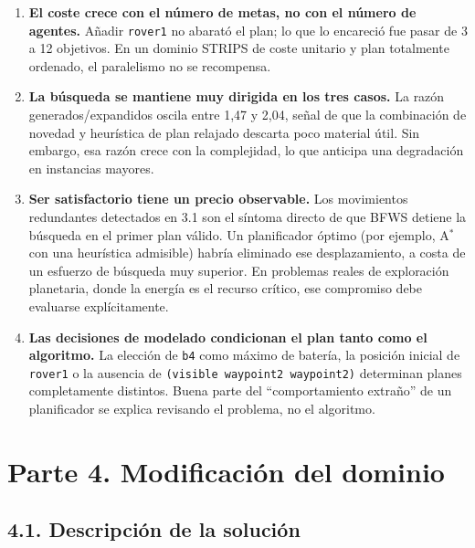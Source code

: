 \documentclass[12pt,a4paper]{article}
\begin{document}
\begin{enumerate}[leftmargin=*]
\item \textbf{El coste crece con el n\'umero de metas, no con el n\'umero de
agentes.} A\~nadir \texttt{rover1} no abarat\'o el plan; lo que lo encareci\'o
fue pasar de 3 a 12 objetivos. En un dominio STRIPS de coste unitario y plan
totalmente ordenado, el paralelismo no se recompensa.

\item \textbf{La b\'usqueda se mantiene muy dirigida en los tres casos.} La
raz\'on generados/expandidos oscila entre 1,47 y 2,04, se\~nal de que la
combinaci\'on de novedad y heur\'istica de plan relajado descarta poco
material \'util. Sin embargo, esa raz\'on crece con la complejidad, lo que
anticipa una degradaci\'on en instancias mayores.

\item \textbf{Ser satisfactorio tiene un precio observable.} Los movimientos
redundantes detectados en 3.1 son el s\'intoma directo de que BFWS detiene la
b\'usqueda en el primer plan v\'alido. Un planificador \'optimo (por ejemplo,
A$^\ast$ con una heur\'istica admisible) habr\'ia eliminado ese
desplazamiento, a costa de un esfuerzo de b\'usqueda muy superior. En
problemas reales de exploraci\'on planetaria, donde la energ\'ia es el recurso
cr\'itico, ese compromiso debe evaluarse expl\'icitamente.

\item \textbf{Las decisiones de modelado condicionan el plan tanto como el
algoritmo.} La elecci\'on de \texttt{b4} como m\'aximo de bater\'ia, la
posici\'on inicial de \texttt{rover1} o la ausencia de
\texttt{(visible waypoint2 waypoint2)} determinan planes completamente
distintos. Buena parte del ``comportamiento extra\~no'' de un planificador se
explica revisando el problema, no el algoritmo.
\end{enumerate}

\section{Parte 4. Modificaci\'on del dominio}

\subsection{4.1. Descripci\'on de la soluci\'on}
\end{document}
